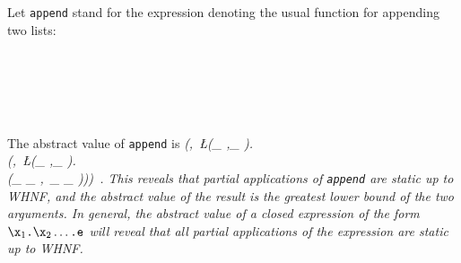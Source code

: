 \documentclass[11pt]{article}
\begin{document}
Let \mbox{\tt append} stand for the expression denoting the usual function for
appending two lists:
\begin{flushleft}
\vspace{-0.0em}\vspace{-0.0em}\\
\vspace{-0.0em}\\
\vspace{-0.0em}\\
\vspace{-0.0em}\\
\vspace{-0.0em}
\end{flushleft}
The abstract value of \mbox{\tt append} is
\beqs
\it (\ID,\ \L(\A_{ },\K_{ }).\\
\it (\ID,\ \L(\A_{ },\K_{ }).\\
\it (\A_{ }\glb\A_{ },\ \K_{ }\glb\K_{ })))\ .
\eeqs
This reveals that partial applications of \mbox{\tt append} are static up to
WHNF, and the abstract value of the result is the greatest lower bound
of the two arguments.  In general, the abstract value of a closed
expression of the form $\mbox{\tt {\char'134}x}_1\mbox{\tt .{\char'134}x}_2\ldots\mbox{\tt .e}$ will reveal that all
partial applications of the expression are static up to WHNF.
\end{document}
